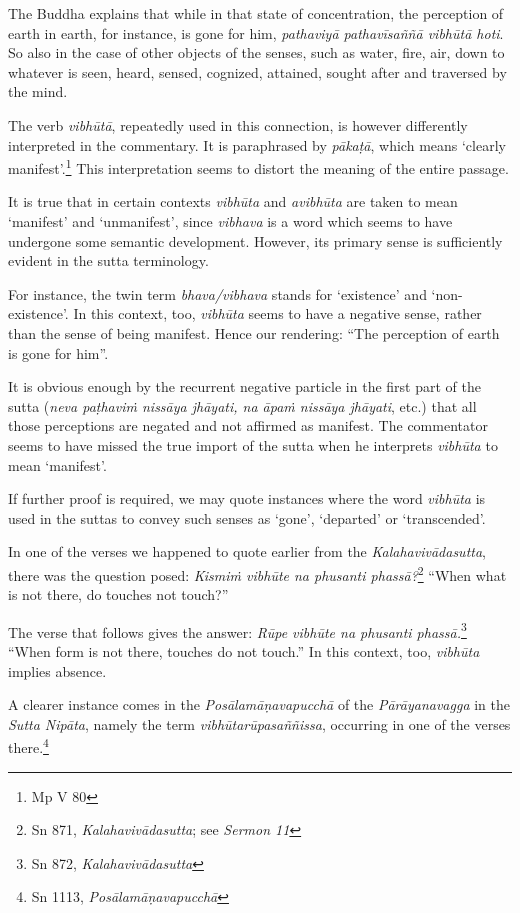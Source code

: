 The Buddha explains that while in that state of concentration, the perception of earth in earth, for instance, is gone for him, \emph{pathaviyā pathavīsaññā vibhūtā hoti}. So also in the case of other objects of the senses, such as water, fire, air, down to whatever is seen, heard, sensed, cognized, attained, sought after and traversed by the mind.

The verb \emph{vibhūtā}, repeatedly used in this connection, is however differently interpreted in the commentary. It is paraphrased by \emph{pākaṭā}, which means `clearly manifest'.\footnote{Mp V 80} This interpretation seems to distort the meaning of the entire passage.

It is true that in certain contexts \emph{vibhūta} and \emph{avibhūta} are taken to mean `manifest' and `unmanifest', since \emph{vibhava} is a word which seems to have undergone some semantic development. However, its primary sense is sufficiently evident in the sutta terminology.

For instance, the twin term \emph{bhava/vibhava} stands for `existence' and `non-existence'. In this context, too, \emph{vibhūta} seems to have a negative sense, rather than the sense of being manifest. Hence our rendering: ``The perception of earth is gone for him''.

It is obvious enough by the recurrent negative particle in the first part of the sutta (\emph{neva paṭhaviṁ nissāya jhāyati, na āpaṁ nissāya jhāyati}, etc.) that all those perceptions are negated and not affirmed as manifest. The commentator seems to have missed the true import of the sutta when he interprets \emph{vibhūta} to mean `manifest'.

If further proof is required, we may quote instances where the word \emph{vibhūta} is used in the suttas to convey such senses as `gone', `departed' or `transcended'.

In one of the verses we happened to quote earlier from the \emph{Kalahavivādasutta}, there was the question posed: \emph{Kismiṁ vibhūte na phusanti phassā?}\footnote{Sn 871, \emph{Kalahavivādasutta}; see \emph{Sermon 11}} ``When what is not there, do touches not touch?''

The verse that follows gives the answer: \emph{Rūpe vibhūte na phusanti phassā.}\footnote{Sn 872, \emph{Kalahavivādasutta}} ``When form is not there, touches do not touch.'' In this context, too, \emph{vibhūta} implies absence.

A clearer instance comes in the \emph{Posālamāṇavapucchā} of the \emph{Pārāyanavagga} in the \emph{Sutta Nipāta}, namely the term \emph{vibhūtarūpasaññissa}, occurring in one of the verses there.\footnote{Sn 1113, \emph{Posālamāṇavapucchā}}

